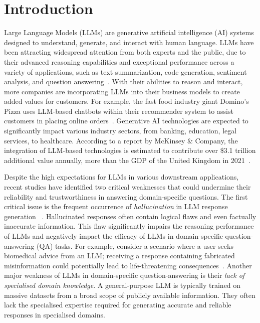 \section*{Introduction}\label{sec:introduction}

Large Language Models (LLMs) are generative artificial intelligence (AI) systems designed to understand, generate, and interact with human language. 
LLMs have been attracting widespread attention from both experts and
the public, due to their advanced reasoning capabilities and exceptional performance across a variety of applications, such as text summarization, code generation, sentiment analysis, and question answering~\parencite{brown2020language, zero-shot-reasoner, palm, won2024scaling}.
With their abilities to reason and interact, more companies are incorporating LLMs into their business models to create added values for customers. 
For example, the fast food industry giant Domino's Pizza uses LLM-based chatbots within their recommender system
to assist customers in placing online orders~\parencite{dominos_ai}.
Generative AI technologies are expected to significantly impact various industry sectors, from banking, education, legal services, to healthcare. According to a report by McKinsey \& Company, the integration of LLM-based technologies is estimated to contribute over \$3.1 trillion additional value annually, more than the GDP of the United Kingdom in 2021~\parencite{mkinsey}.

Despite the high expectations for LLMs in various downstream applications, recent studies have identified two critical weaknesses that could undermine their reliability and trustworthiness in answering domain-specific questions.
The first critical issue is the frequent occurrence of \emph{hallucination} in LLM response generation
~\parencite{kgr, kalm-prompting, huang2023survey, ji2023survey}. 
Hallucinated responses often contain logical flaws and even factually inaccurate information.
This flaw significantly impairs the reasoning performance of LLMs and negatively impact the efficacy of LLMs in domain-specific question-answering (QA) tasks.
For example, consider a scenario where a user seeks biomedical advice from an LLM; receiving a response containing fabricated misinformation could potentially lead to life-threatening consequences~\parencite{pmc-llama}.
Another major weakness of LLMs in domain-specific question-answering is their \emph{lack of specialised domain knowledge}.
A general-purpose LLM is typically trained on massive datasets from a broad scope of publicly available information. They often lack the specialised expertise required for generating accurate and reliable responses in specialised domains.

